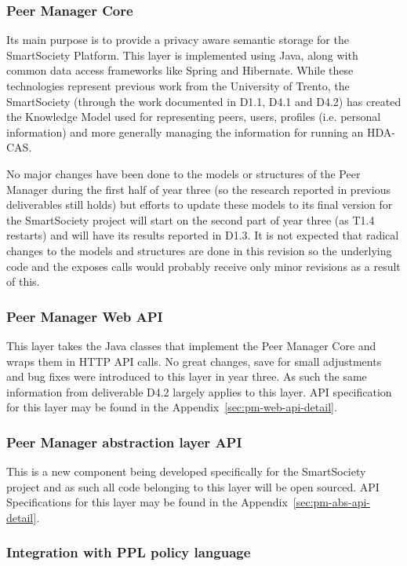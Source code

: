 \subsubsection{Peer Manager Core}
Its main purpose is to provide a privacy aware semantic storage for the SmartSociety Platform. This layer is implemented using Java, along with common data access frameworks like Spring and Hibernate.
While these technologies represent previous work from the University of Trento, the SmartSociety (through the work documented in D1.1, D4.1 and D4.2) has created the Knowledge Model used for representing peers, users, profiles (i.e. personal information) and more generally managing the information for running an HDA-CAS.

No major changes have been done to the models or structures of the Peer Manager during the first half of year three (so the research reported in previous deliverables still holds) but efforts to update these models to its final version for the SmartSociety project will start on the second part of year three (as T1.4 restarts) and will have its results reported in D1.3. It is not expected that radical changes to the models and structures are done in this revision so the underlying code and the exposes calls would probably receive only minor revisions as a result of this. 

\subsubsection{Peer Manager Web API} \label{ssec:pm-web-api}
This layer takes the Java classes that implement the Peer Manager Core and wraps them in HTTP API calls. 
No great changes, save for small adjustments and bug fixes were introduced to this layer in year three. As such the same information from deliverable D4.2 largely applies to this layer.
API specification for this layer may be found in the Appendix~\ref{sec:pm-web-api-detail}.


\subsubsection{Peer Manager abstraction layer API} \label{ssec:pm-abs-api}
This is a new component being developed specifically for the SmartSociety project and as such all code belonging to this layer will be open sourced. API Specifications for this layer may be found in the Appendix~\ref{sec:pm-abs-api-detail}.


\subsubsection{Integration with PPL policy language}
